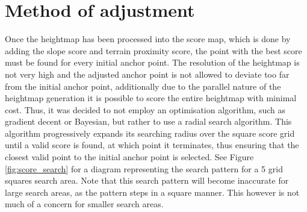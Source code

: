 \section{Method of adjustment}
    Once the heightmap has been processed into the score map, which is done by adding the
    slope score and terrain proximity score, the point with the best score must be found for every
    initial anchor point.
    The resolution of the heightmap is not very high and the adjusted anchor point is not
    allowed to deviate too far from the initial anchor point, additionally due to the parallel nature
    of the heightmap generation it is possible to score the entire heightmap with minimal cost.
    Thus, it was decided to not employ an optimisation algorithm, such as gradient decent or
    Bayesian, but rather to use a radial search algorithm. This algorithm progressively expands
    its searching radius over the square score grid until a valid score is found, at which point it
    terminates, thus ensuring that the closest valid point to the initial anchor point is selected.
    See Figure \ref{fig:score_search} for a diagram representing the search pattern for a 5 grid squares search area.
    Note that this search pattern will become inaccurate for large search areas, as the pattern steps
    in a square manner. This however is not much of a concern for smaller search areas.
